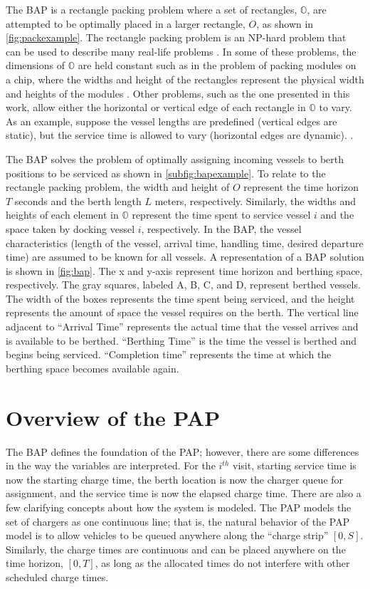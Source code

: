 \documentclass[ee,thesis]{usuthesis}
\begin{document}
The BAP is a rectangle packing problem where a set of rectangles, \(\mathbb{O}\), are attempted to be optimally placed in
a larger rectangle, \(O\), as shown in \autoref{fig:packexample}. The rectangle packing problem is an NP-hard problem that
can be used to describe many real-life problems \cite{bruin-2013-rectan-packin,murata-1995-rectan}. In some of these
problems, the dimensions of \(\mathbb{O}\) are held constant such as in the problem of packing modules on a chip, where
the widths and height of the rectangles represent the physical width and heights of the modules
\cite{murata-1995-rectan}. Other problems, such as the one presented in this work, allow either the horizontal or
vertical edge of each rectangle in \(\mathbb{O}\) to vary. As an example, suppose the vessel lengths are predefined
(vertical edges are static), but the service time is allowed to vary (horizontal edges are dynamic).
\cite{buhrkal-2011-model-discr}.

The BAP solves the problem of optimally assigning incoming vessels to berth positions to be serviced as shown in
\autoref{subfig:bapexample}. To relate to the rectangle packing problem, the width and height of \(O\) represent the time
horizon \(T\) seconds and the berth length \(L\) meters, respectively. Similarly, the widths and heights of each element in
\(\mathbb{O}\) represent the time spent to service vessel \(i\) and the space taken by docking vessel \(i\), respectively. In
the BAP, the vessel characteristics (length of the vessel, arrival time, handling time, desired departure time) are
assumed to be known for all vessels. A representation of a BAP solution is shown in \autoref{fig:bap}. The x and y-axis
represent time horizon and berthing space, respectively. The gray squares, labeled A, B, C, and D, represent berthed
vessels. The width of the boxes represents the time spent being serviced, and the height represents the amount of space
the vessel requires on the berth. The vertical line adjacent to ``Arrival Time'' represents the actual time that the
vessel arrives and is available to be berthed. ``Berthing Time'' is the time the vessel is berthed and begins being
serviced. ``Completion time'' represents the time at which the berthing space becomes available again.

\section{Overview of the PAP}
\label{sec:overview-of-the-pap}
The BAP defines the foundation of the PAP; however, there are some differences in the way the variables are interpreted. For
the \(i^{th}\) visit, starting service time is now the starting charge time, the berth location is now the charger queue
for assignment, and the service time is now the elapsed charge time. There are also a few clarifying concepts about how
the system is modeled. The PAP models the set of chargers as one continuous line; that is, the natural behavior of the
PAP model is to allow vehicles to be queued anywhere along the ``charge strip'' \([0,S]\). Similarly, the charge times are
continuous and can be placed anywhere on the time horizon, \([0,T]\), as long as the allocated times do not interfere with
other scheduled charge times.
\end{document}
